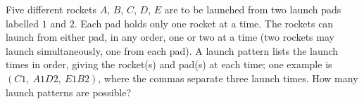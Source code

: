 Five different rockets $A$, $B$, $C$, $D$, $E$ are to be launched from two launch pads labelled $1$ and $2$. Each pad holds only one rocket at a time. The rockets can launch from either pad, in any order, one or two at a time (two rockets may launch simultaneously, one from each pad). A launch pattern lists the launch times in order, giving the rocket(s) and pad(s) at each time; one example is $(C1,\ A1D2,\ E1B2)$, where the commas separate three launch times. How many launch patterns are possible?
